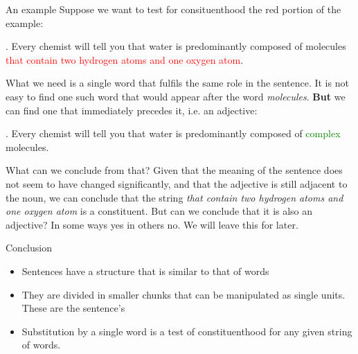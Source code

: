 \begin{frame}
  {An example}
Suppose we want to test for consituenthood the red portion of the example:

   \ex.
Every chemist will tell you that water is predominantly composed of molecules  \textcolor{red}{that contain two hydrogen atoms and one oxygen atom}.

What we need is a single word that fulfils the same role in the sentence.  It is not easy to find one such word that would appear after the word \textit{molecules}.  \textbf{But} we can find one that immediately precedes it, i.e. an adjective:

  \ex.
Every chemist will tell you that water is predominantly composed of \textcolor{green}{complex} molecules.

\end{frame}

\begin{frame}
  What can we conclude from that?
Given that the meaning of the sentence does not seem to have changed significantly, and that the adjective is still adjacent to the noun, we can conclude that the string \textit{that contain two hydrogen atoms and one oxygen atom} is a constituent.  But can we conclude that it is also an adjective?  In some ways yes in others no.  We will leave this for later.

\end{frame}

\begin{frame}
  {Conclusion}
\begin{itemize}
\item Sentences have a structure that is similar to that of words
\item They are divided in smaller chunks that can be manipulated as single units.  These are the sentence's 
\item Substitution by a single word is a test of constituenthood for any given string of words.
\end{itemize}

\end{frame}



